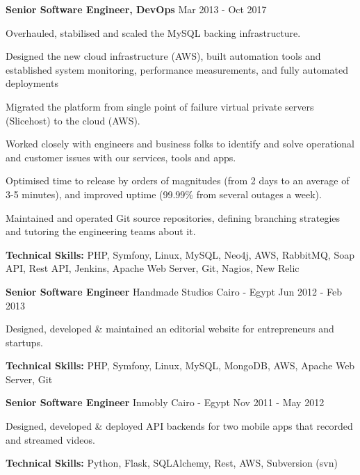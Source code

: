 \begin{cventries}
	\cventry
	{\textbf{Senior Software Engineer, DevOps}} %
	{} %
	{} %
	{Mar 2013 - Oct 2017} %
	{
		\begin{cvitems} %
			\item {Overhauled, stabilised and scaled the MySQL backing infrastructure.}
			\item {Designed the new cloud infrastructure (AWS), built automation tools and established system monitoring,
			            performance measurements, and fully automated deployments}
			\item {Migrated the platform from single point of failure virtual private servers (Slicehost) to the cloud (AWS).}
			\item {Worked closely with engineers and business folks to identify and solve operational and customer issues with
			            our services, tools and apps.}
			\item {Optimised time to release by orders of magnitudes (from 2 days to an average of 3-5 minutes), and improved
			            uptime (99.99\% from several outages a week).}
			\item {Maintained and operated Git source repositories, defining branching strategies and tutoring the engineering
			            teams about it.}
			\item {\textbf{Technical Skills:} PHP, Symfony, Linux, MySQL, Neo4j,  AWS, RabbitMQ, Soap API, Rest API, Jenkins,
			            Apache Web Server, Git, Nagios, New Relic}
		\end{cvitems}
	}

	\cventry
	{\textbf{Senior Software Engineer}} %
	{Handmade Studios} %
	{Cairo - Egypt} %
	{Jun 2012 - Feb 2013} %
	{
		\begin{cvitems} %
			\item {Designed, developed \& maintained an editorial website for entrepreneurs and startups.}
			\item {\textbf{Technical Skills:} PHP, Symfony, Linux, MySQL, MongoDB, AWS, Apache Web Server, Git}
		\end{cvitems}
	}

	\cventry
	{\textbf{Senior Software Engineer}} %
	{Inmobly} %
	{Cairo - Egypt} %
	{Nov 2011 - May 2012} %
	{
		\begin{cvitems} %
			\item {Designed, developed \& deployed API backends for two mobile apps that recorded and streamed videos.}
			\item {\textbf{Technical Skills:} Python, Flask, SQLAlchemy, Rest, AWS, Subversion (svn)}
		\end{cvitems}
	}


\end{cventries}

